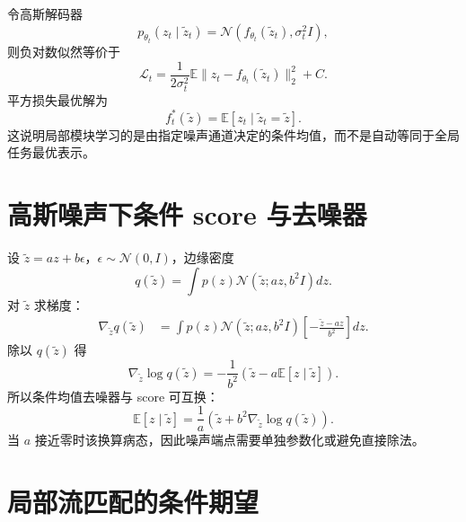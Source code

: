 \documentclass[11pt]{article}
\numberwithin{equation}{section}
\newcommand{\E}{\mathbb{E}}
\newcommand{\1}{\mathbf{1}}
\newcommand{\cN}{\mathcal{N}}
\newcommand{\cL}{\mathcal{L}}
\begin{document}
令高斯解码器
\begin{equation}
 p_{\theta_t}(z_t\mid\widetilde z_t)
 =\cN(f_{\theta_t}(\widetilde z_t),\sigma_t^2I),
\end{equation}
则负对数似然等价于
\begin{equation}
 \cL_t=\frac1{2\sigma_t^2}
 \E\|z_t-f_{\theta_t}(\widetilde z_t)\|_2^2+C.
\end{equation}
平方损失最优解为
\begin{equation}
 f_t^*(\widetilde z)=\E[z_t\mid\widetilde z_t=\widetilde z].
\end{equation}
这说明局部模块学习的是由指定噪声通道决定的条件均值，而不是自动等同于全局任务最优表示。

\section{高斯噪声下条件 score 与去噪器}

设 $\widetilde z=az+b\epsilon$，$\epsilon\sim\cN(0,I)$，边缘密度
\begin{equation}
 q(\widetilde z)=\int p(z)
 \cN(\widetilde z;az,b^2I)dz.
\end{equation}
对 $\widetilde z$ 求梯度：
\begin{align}
 \nabla_{\widetilde z}q(\widetilde z)
 &=\int p(z)\cN(\widetilde z;az,b^2I)
 \left[-\frac{\widetilde z-az}{b^2}\right]dz.
\end{align}
除以 $q(\widetilde z)$ 得
\begin{equation}
 \nabla_{\widetilde z}\log q(\widetilde z)
 =-\frac1{b^2}\left(\widetilde z-a\E[z\mid\widetilde z]\right).
\end{equation}
所以条件均值去噪器与 score 可互换：
\begin{equation}
 \boxed{\E[z\mid\widetilde z]
 =\frac1a\left(\widetilde z+b^2
 \nabla_{\widetilde z}\log q(\widetilde z)\right).}
\end{equation}
当 $a$ 接近零时该换算病态，因此噪声端点需要单独参数化或避免直接除法。

\section{局部流匹配的条件期望}
\end{document}
